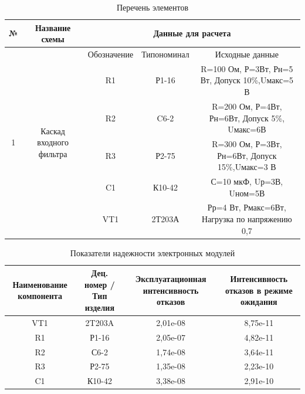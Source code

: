 \documentclass[a4paper,14pt]{article}
\begin{document}
\begin{table}[H]
	\caption{Перечень элементов}
	\label{tab:element_list}
	\begin{adjustbox}{width=\linewidth}
	\begin{tabular}{|c|c|c|c|c|}
		\hline
		№                  & Название схемы                           & \multicolumn{3}{c|}{Данные для расчета}                                     \\ \hline
		\multirow{6}{*}{1} & \multirow{6}{*}{Каскад входного фильтра} & Обозначение & Типономинал & Исходные данные                                 \\ \cline{3-5} 
		&                                          & R1          & Р1-16       & R=100 Ом, Р=3Вт, Рн=5 Вт, Допуск 10\%,Uмакс=5 В \\ \cline{3-5} 
		&                                          & R2          & C6-2        & R=200 Ом, Р=4Вт, Рн=6Вт, Допуск 5\%, Uмакс=6В   \\ \cline{3-5} 
		&                                          & R3          & Р2-75       & R=300 Ом, Р=3Вт, Рн=6Вт, Допуск 15\%,Uмакс=3 В  \\ \cline{3-5} 
		&                                          & C1          & К10-42      & С=10 мкФ, Uр=3В, Uном=5В                        \\ \cline{3-5} 
		&                                          & VT1         & 2Т203А      & Рр=4 Вт, Рмакс=6Вт, Нагрузка по напряжению 0,7  \\ \hline
	\end{tabular}
	\end{adjustbox}
\end{table}

\begin{table}[H]
	\caption{Показатели надежности электронных модулей}
	\label{tab:tab_2}
	\begin{adjustbox}{width=\linewidth}
	\begin{tabular}{|c|c|c|c|}
		\hline
		Наименование компонента & Дец. номер / Тип изделия & Эксплуатационная   интенсивность отказов & Интенсивность отказов в режиме ожидания \\ \hline
		VT1                     & 2T203A               & 2,01e-08                                 & 8,75e-11                                \\ \hline
		R1                      & Р1-16                     & 2,05e-07                                 & 4,82e-11                                \\ \hline
		R2                      & С6-2                     & 1,74e-08                                 & 3,64e-11                                \\ \hline
		R3                      & Р2-75                    & 1,35e-08                                 & 2,23e-10                                \\ \hline
		C1                      & К10-42                  & 3,38e-08                                 & 2,91e-10                                \\ \hline
	\end{tabular}
	\end{adjustbox}
\end{table}
\end{document}
